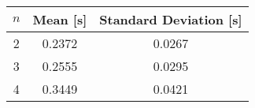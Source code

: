 \begin {tabular}{c|c|c}
$n$ & Mean [s] & Standard Deviation [s]
\\\hline
2 &  0.2372 &  0.0267\\
3 &  0.2555 &  0.0295\\
4 &  0.3449 &  0.0421\\
\end{tabular}
